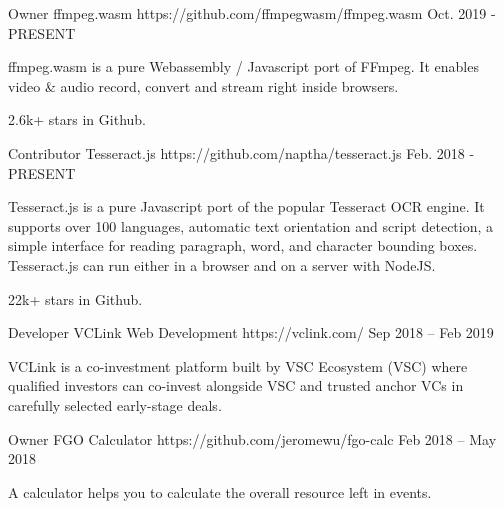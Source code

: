 

\begin{cventries}

  \cventry
    {Owner} %
    {ffmpeg.wasm} %
    {https://github.com/ffmpegwasm/ffmpeg.wasm} %
    {Oct. 2019 - PRESENT} %
    {
      \begin{cvitems} %
        \item {ffmpeg.wasm is a pure Webassembly / Javascript port of FFmpeg. It enables video \& audio record, convert and stream right inside browsers.}
        \item {2.6k+ stars in Github.}
      \end{cvitems}
    }

  \cventry
    {Contributor} %
    {Tesseract.js} %
    {https://github.com/naptha/tesseract.js} %
    {Feb. 2018 - PRESENT} %
    {
      \begin{cvitems} %
        \item {Tesseract.js is a pure Javascript port of the popular Tesseract OCR engine. It supports over 100 languages, automatic text orientation and script detection, a simple interface for reading paragraph, word, and character bounding boxes. Tesseract.js can run either in a browser and on a server with NodeJS.}
        \item {22k+ stars in Github.}
      \end{cvitems}
    }

  \cventry
    {Developer} %
    {VCLink Web Development} %
    {https://vclink.com/} %
    {Sep 2018 – Feb 2019} %
    {
      \begin{cvitems} %
        \item {VCLink is a co-investment platform built by VSC Ecosystem (VSC) where qualified investors can co-invest alongside VSC and trusted anchor VCs in carefully selected early-stage deals.}
      \end{cvitems}
    }

  \cventry
    {Owner} %
    {FGO Calculator} %
    {https://github.com/jeromewu/fgo-calc} %
    {Feb 2018 – May 2018} %
    {
      \begin{cvitems} %
        \item {A calculator helps you to calculate the overall resource left in events.}
      \end{cvitems}
    }

\end{cventries}
